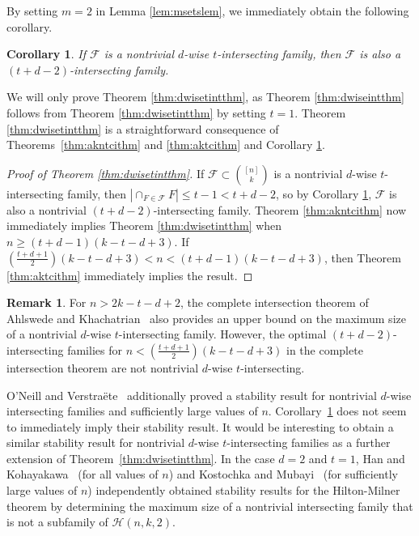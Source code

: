\documentclass[12pt]{article}
\newtheorem{corollary}{Corollary}
\theoremstyle{definition}
\newtheorem{remark}{Remark}
\newcommand{\cH}{\mathcal{H}}
\newcommand{\cF}{\mathcal{F}}
\begin{document}
By setting $m=2$ in Lemma \ref{lem:msetslem}, we immediately obtain the following corollary. 
\begin{corollary}\label{cor:dwisecor}
If $\cF$ is a nontrivial $d$-wise $t$-intersecting family, then $\cF$ is also a $(t+d-2)$-intersecting family. 
\end{corollary}

We will only prove Theorem \ref{thm:dwisetintthm}, as Theorem \ref{thm:dwiseintthm} follows from Theorem \ref{thm:dwisetintthm} by setting $t=1$. Theorem \ref{thm:dwisetintthm} is a  straightforward consequence of Theorems~\ref{thm:akntcithm} and \ref{thm:aktcithm} and Corollary \ref{cor:dwisecor}. 


\begin{proof}[Proof of Theorem \ref{thm:dwisetintthm}]
If $\cF \subset \binom{[n]}{k}$ is a nontrivial $d$-wise $t$-intersecting family, then $|\cap_{F\in \cF}F| \le t - 1 < t + d - 2$, so by Corollary \ref{cor:dwisecor}, $\cF$ is also a nontrivial $(t+d-2)$-intersecting family. Theorem \ref{thm:akntcithm} now immediately implies Theorem \ref{thm:dwisetintthm} when $n\ge (t+d-1)(k- t - d + 3)$.  If $\left(\frac{t+d+1}{2}\right)(k-t-d+3) < n < (t+d-1)(k-t-d+3)$, then Theorem \ref{thm:aktcithm} immediately implies the result.
\end{proof}

\begin{remark}\label{rem:AKCITimprov}
For $n > 2k - t - d +2$, the complete intersection theorem of Ahlswede and Khachatrian~\cite{AK1, AK3} also provides an upper bound on the maximum size of a nontrivial $d$-wise $t$-intersecting family. However, the optimal $(t+d-2)$-intersecting families for $n < \left(\frac{t+d+1}{2}\right)(k-t-d+3)$ in the complete intersection theorem are not nontrivial $d$-wise $t$-intersecting.
\end{remark}

O'Neill and Verstra\"{e}te~\cite[Theorem~2]{OV} additionally proved a stability result for nontrivial $d$-wise intersecting families and sufficiently large values of $n$. Corollary~\ref{cor:dwisecor} does not seem to immediately imply their stability result. It would be interesting to obtain a similar stability result for nontrivial $d$-wise $t$-intersecting families as a further extension of Theorem~\ref{thm:dwisetintthm}. In the case $d=2$ and $t=1$, Han and Kohayakawa~\cite{HK} (for all values of $n$) and Kostochka and Mubayi~\cite{KM} (for sufficiently large values of $n$) independently obtained stability results for the Hilton-Milner theorem by determining the maximum size of a nontrivial intersecting family that is not a subfamily of $\cH(n, k, 2)$. 
\end{document}
